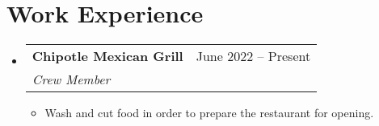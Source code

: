 \documentclass[letter,11pt]{article}
\makeatletter
\newcommand{\resumeItem}[1]{
  \item\small{
    {#1 \vspace{-2pt}}
  }
}
\newcommand{\resumeSubheading}[4]{
  \vspace{-2pt}\item
    \begin{tabular*}{0.97\textwidth}[t]{l@{\extracolsep{\fill}}r}
      \textbf{#1} & #2 \\
      \textit{\small#3} & \textit{\small #4} \\
    \end{tabular*}\vspace{-7pt}
}
\newcommand{\resumeSubheadingListStart}{\begin{itemize}[leftmargin=0.15in, label={}]}
\newcommand{\resumeSubheadingListEnd}{\end{itemize}}
\newcommand{\resumeItemListStart}{\begin{itemize}}
\newcommand{\resumeItemListEnd}{\end{itemize}\vspace{-5pt}}
\makeatother
\begin{document}
\section{Work Experience}
    \resumeSubheadingListStart
        \resumeSubheading{Chipotle Mexican Grill}{June 2022 -- Present}{Crew Member}{}
        \resumeItemListStart
            \resumeItem{Wash and cut food in order to prepare the restaurant for opening.}
        \resumeItemListEnd
    \resumeSubheadingListEnd
\end{document}
